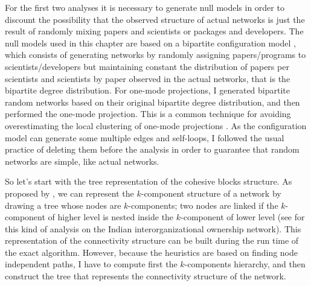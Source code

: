 For the first two analyses it is necessary to generate null models in order to discount the possibility that the observed structure of actual networks is just the result of randomly mixing papers and scientists or packages and developers. The null models used in this chapter are based on a bipartite configuration model \citep{newman:2003}, which consists of generating networks by randomly assigning papers/programs to scientists/developers but maintaining constant the distribution of papers per scientists and scientists by paper observed in the actual networks, that is the bipartite degree distribution. For one-mode projections, I generated bipartite random networks based on their original bipartite degree distribution, and then performed the one-mode projection. This is a common technique for avoiding overestimating the local clustering of one-mode projections \citep{uzzi:2007}. As the configuration model can generate some multiple edges and self-loops, I followed the usual practice of deleting them before the analysis in order to guarantee that random networks are simple, like actual networks.

So let's start with the tree representation of the cohesive blocks structure. As proposed by \citet{white:2004}, we can represent the $k$-component structure of a network by drawing a tree whose nodes are $k$-components; two nodes are linked if the $k$-component of higher level is nested inside the $k$-component of lower level (see \citet[1643,1651]{mani:2014} for this kind of analysis on the Indian interorganizational ownership network). This representation of the connectivity structure can be built during the run time of the exact algorithm. However, because the heuristics are based on finding node independent paths, I have to compute first the $k$-components hierarchy, and then construct the tree that represents the connectivity structure of the network.

